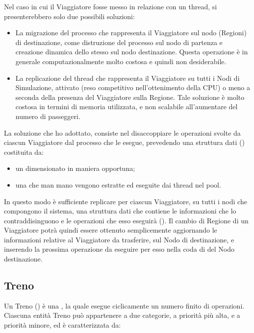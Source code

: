 	Nel caso in cui il Viaggiatore fosse messo in relazione con un thread, si presenterebbero solo due possibili soluzioni:
		\begin{itemize}
			\item La migrazione del processo che rappresenta il Viaggiatore sul nodo (Regioni) di destinazione, come distruzione del processo sul nodo di partenza e creazione dinamica dello stesso sul nodo destinazione. Questa operazione è in generale computazionalmente molto costosa e quindi non desiderabile.
			\item La replicazione del thread che rappresenta il Viaggiatore su tutti i Nodi di Simulazione, attivato (reso competitivo nell'ottenimento della CPU) o meno a seconda della presenza del Viaggiatore sulla Regione. Tale soluzione è molto costosa in termini di memoria utilizzata, e non scalabile all'aumentare del numero di passeggeri.
		\end{itemize}
		
	La soluzione che ho adottato, consiste nel disaccoppiare le operazioni svolte da ciascun Viaggiatore dal processo che le esegue, prevedendo una struttura dati () costituita da:
		\begin{itemize}
			\item un  dimensionato in maniera opportuna;
			\item una  che man mano vengono estratte ed eseguite dai thread nel pool.
		\end{itemize}
	In questo modo è sufficiente replicare per ciascun Viaggiatore, su tutti i nodi che compongono il sistema, una struttura dati che contiene le informazioni che lo contraddisinguono e le operazioni che esso eseguirà (). 
	Il cambio di Regione di un Viaggiatore potrà quindi essere ottenuto semplicemente aggiornando le informazioni relative al Viaggiatore da trasferire, sul Nodo di destinazione, e inserendo la prossima operazione da eseguire per esso nella coda di  del Nodo destinazione.
	
	\subsection{Treno} \label{subsec:train_def}
	Un Treno () è una , la quale esegue ciclicamente un numero finito di operazioni. Ciascuna entità Treno può appartenere a due categorie,  a priorità più alta, e  a priorità minore, ed è caratterizzata da:
		
